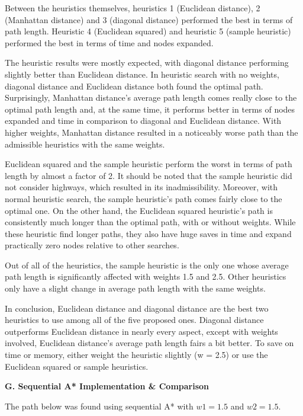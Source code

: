 \documentclass[12pt, letterpaper]{article}
\begin{document}
Between the heuristics themselves, heuristics 1 (Euclidean distance), 2 (Manhattan distance) and 3 (diagonal distance) performed the best in terms of path length. Heuristic 4 (Euclidean squared) and heuristic 5 (sample heuristic) performed the best in terms of time and nodes expanded.

The heuristic results were mostly expected, with diagonal distance performing slightly better than Euclidean distance. In heuristic search with no weights, diagonal distance and Euclidean distance both found the optimal path. Surprisingly, Manhattan distance's average path length comes really close to the optimal path length and, at the same time, it performs better in terms of nodes expanded and time in comparison to diagonal and Euclidean distance. With higher weights, Manhattan distance resulted in a noticeably worse path than the admissible heuristics with the same weights. 

Euclidean squared and the sample heuristic perform the worst in terms of path length by almost a factor of 2. It should be noted that the sample heuristic did not consider highways, which resulted in its inadmissibility. Moreover, with normal heuristic search, the sample heuristic's path comes fairly close to the optimal one. On the other hand, the Euclidean squared heuristic's path is consistently much longer than the optimal path, with or without weights. While these heuristic find longer paths, they also have huge saves in time and expand practically zero nodes relative to other searches.

Out of all of the heuristics, the sample heuristic is the only one whose average path length is significantly affected with weights 1.5 and 2.5. Other heuristics only have a slight change in average path length with the same weights.

In conclusion, Euclidean distance and diagonal distance are the best two heuristics to use among all of the five proposed ones. Diagonal distance outperforms Euclidean distance in nearly every aspect, except with weights involved, Euclidean distance's average path length fairs a bit better. To save on time or memory, either weight the heuristic slightly (w = 2.5) or use the Euclidean squared or sample heuristics.

\pagebreak %

\noindent \textbf{G. Sequential A* Implementation \& Comparison}

The path below was found using sequential A* with $w1 = 1.5$ and $w2 = 1.5$.
\end{document}
